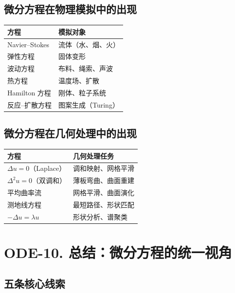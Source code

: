 \subsection{微分方程在物理模拟中的出现}

\begin{center}
\begin{tabular}{L{4cm}L{5cm}}
\toprule
\textbf{方程} & \textbf{模拟对象} \\
\midrule
Navier--Stokes & 流体（水、烟、火） \\
弹性方程 & 固体变形 \\
波动方程 & 布料、绳索、声波 \\
热方程 & 温度场、扩散 \\
Hamilton 方程 & 刚体、粒子系统 \\
反应--扩散方程 & 图案生成（Turing） \\
\bottomrule
\end{tabular}
\end{center}

\subsection{微分方程在几何处理中的出现}

\begin{center}
\begin{tabular}{L{4cm}L{5cm}}
\toprule
\textbf{方程} & \textbf{几何处理任务} \\
\midrule
$\Delta u = 0$（Laplace） & 调和映射、网格平滑 \\
$\Delta^2 u = 0$（双调和） & 薄板弯曲、曲面重建 \\
平均曲率流 & 网格平滑、曲面演化 \\
测地线方程 & 最短路径、形状匹配 \\
$-\Delta u = \lambda u$ & 形状分析、谱聚类 \\
\bottomrule
\end{tabular}
\end{center}

\section{ODE-10. 总结：微分方程的统一视角}

\subsection{五条核心线索}

